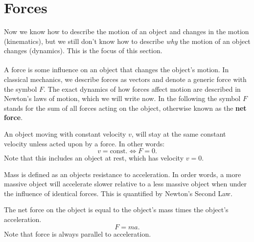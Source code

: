 \documentclass[../classical_mechanics.tex]{subfiles}
\begin{document}
    \section{Forces}
        \paragraph{}
        Now we know how to describe the motion of an object and changes in the motion (kinematics), but we still don't know how to describe \textit{why} the motion of an object changes (dynamics).
        This is the focus of this section.

        \paragraph{}
        A force is some influence on an object that changes the object's motion.
        In classical mechanics, we describe forces as vectors and denote a generic force with the symbol $F$.
        The exact dynamics of how forces affect motion are described in Newton's laws of motion, which we will write now.
        In the following the symbol $F$ stands for the sum of all forces acting on the object, otherwise known as the \textbf{net force}.
        \begin{definition}\label{def:newton-1}
            An object moving with constant velocity $v$, will stay at the same constant velocity unless acted upon by a force.
            In other words:
            \begin{equation}
                v=\text{const.}\iff F=0.
            \end{equation}
            Note that this includes an object at rest, which has velocity $v=0$.
        \end{definition}
        Mass is defined as an objects resistance to acceleration.
        In order words, a more massive object will accelerate slower relative to a less massive object when under the influence of identical forces.
        This is quantified by Newton's Second Law.
        \begin{definition}\label{def:newton-2}
            The net force on the object is equal to the object's mass times the object's acceleration.
            \begin{equation}
                F=ma.
            \end{equation}
            Note that force is always parallel to acceleration.
        \end{definition}
\end{document}
